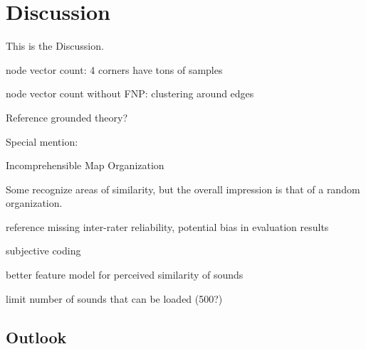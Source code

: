 
\section{Discussion}
\label{sec:discussion}
This is the Discussion.

node vector count: 4 corners have tons of samples

node vector count without FNP: clustering around edges

Reference grounded theory?

Special mention:

Incomprehensible Map Organization

Some recognize areas of similarity, but the overall impression is that of a
random organization.


reference missing inter-rater reliability,
potential bias in evaluation results

subjective coding

better feature model for perceived similarity of sounds

limit number of sounds that can be loaded (500?)



\subsection{Outlook}
\label{subsec:outlook}
